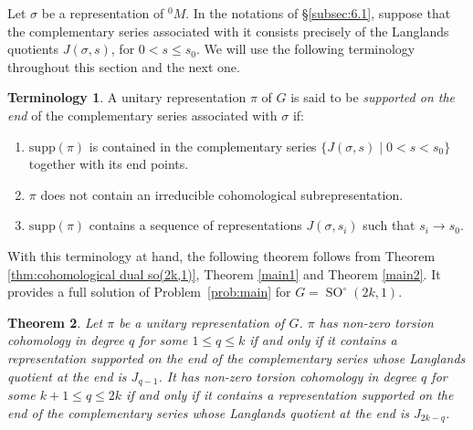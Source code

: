 \documentclass[12pt,reqno]{amsart}
\newtheorem{theorem}{Theorem}[section]
\theoremstyle{definition}
\newtheorem{terminology}[theorem]{Terminology}
\newcommand{\SO}{\operatorname{SO}}
\begin{document}
Let $\sigma$ be a representation of ${^0M}$. In the notations of \S\ref{subsec:6.1}, suppose that the complementary series associated with it consists precisely of the Langlands quotients $J(\sigma,s)$, for $0<s \leq s_0$. We will use the following terminology throughout this section and the next one.
\begin{terminology}\label{term:supp on comp}
    A unitary representation $\pi$ of $G$ is said to be \emph{supported on the end} of the complementary series associated with $\sigma$ if:
    \begin{enumerate}
        \item $\mathrm{supp}(\pi)$ is contained in the complementary series $\{J(\sigma,s) \mid 0<s<s_0\}$ together with its end points.
        \item $\pi$ does not contain an irreducible cohomological subrepresentation.
        \item $\mathrm{supp}(\pi)$ contains a sequence of representations $J(\sigma,s_i)$ such that $s_i \rightarrow s_0$.    
    \end{enumerate}
\end{terminology}
With this terminology at hand, the following theorem follows from Theorem \ref{thm:cohomological dual so(2k,1)}, Theorem \ref{main1} and Theorem \ref{main2}.
It provides a full solution of Problem~\ref{prob:main} for $G=\SO^\circ(2k,1)$.
\begin{theorem}\label{thm:non-Hausdorff for so(2k,1)}
    Let $\pi$ be a unitary representation of $G$. $\pi$ has non-zero torsion cohomology in degree $q$ for some $1 \leq q \leq k$ if and only if it contains a representation supported on the end of the complementary series whose Langlands quotient at the end is $J_{q-1}$. It has non-zero torsion cohomology in degree $q$ for some $k+1 \leq q \leq 2k$ if and only if it contains a representation supported on the end of the complementary series whose Langlands quotient at the end is $J_{2k-q}$.
\end{theorem}
\end{document}
